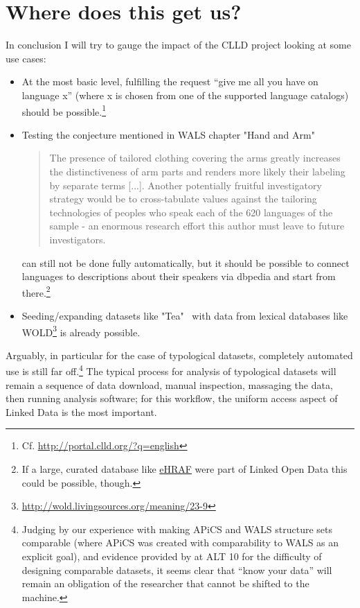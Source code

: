 \documentclass[a4paper,10pt]{article}
\begin{document}
\section{Where does this get us?}
In conclusion I will try to gauge the impact of the CLLD project looking at some use cases:
\begin{itemize}
\item At the most basic level,
fulfilling the request ``give me all you have on language x'' (where x is chosen from one of the supported language catalogs) 
should be possible.\footnote{Cf. \url{http://portal.clld.org/?q=english}}
\item Testing the conjecture mentioned in WALS chapter "Hand and Arm" \cite{wals-129}
\begin{quote}
The presence of tailored clothing covering the arms greatly increases the distinctiveness of arm parts and renders more likely their labeling by separate terms [...]. Another potentially fruitful investigatory strategy would be to cross-tabulate values against the tailoring technologies of peoples who speak each of the 620 languages of the sample - an enormous research effort this author must leave to future investigators.
\end{quote}
can still not be done fully automatically, but it should be possible to connect languages to descriptions about their speakers via 
dbpedia and start from there.\footnote{If a large, curated database like \href{http://www.yale.edu/hraf/}{eHRAF} were part of Linked Open Data this could be possible, though.}
\item Seeding/expanding datasets like "Tea"~\cite{wals-138} with data from lexical databases like WOLD\footnote{\url{http://wold.livingsources.org/meaning/23-9}} is already possible.
\end{itemize}

Arguably, in particular for the case of typological datasets, completely automated use is still far off.\footnote{Judging by our experience with making
APiCS and WALS structure sets comparable (where APiCS was created with comparability to WALS as an explicit goal),
and evidence provided by  at ALT 10 for the difficulty of designing comparable datasets,
it seems clear that ``know your data'' will remain an obligation of the researcher that cannot be shifted to the machine.}
The typical process for analysis of typological datasets will remain a sequence of 
data download, manual inspection, massaging the data, then running analysis software; for this workflow, the uniform access aspect of Linked Data 
is the most important.
\end{document}
